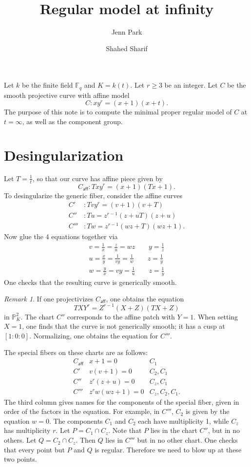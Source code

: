 \documentclass{article}
\newcommand{\caff}{C_{\textsf{aff}}}
\theoremstyle{plain}
\theoremstyle{definition}
\theoremstyle{remark}
\newtheorem{remark}[theorem]{Remark}
\newcommand{\F}{\ensuremath{\mathbb{F}}}
\newcommand{\Pro}{\ensuremath{\mathbb{P}}}
\begin{document}
\title{Regular model at infinity}
\author{Jenn Park \and Shahed Sharif}
\maketitle

Let $k$ be the finite field $\F_q$ and $K = k(t)$. Let $r \geq 3$ be an integer. Let $C$ be the smooth projective curve with affine model
\[
C: xy^r = (x+1)(x+t).
\]
The purpose of this note is to compute the minimal proper regular model of $C$ at $t = \infty$, as well as the component group.

\section{Desingularization}
\label{sec:desingularization}

Let $T = \frac{1}{t}$, so that our curve has affine piece given by
\[
\caff:Txy^r = (x+1)(Tx+1).
\]
To desingularize the generic fiber, consider the affine curves
\begin{align*}
  C'&: Tvy^r = (v+1)(v+T) \\
  C''&: Tu = z^{r-1}(z+uT)(z+u) \\
  C'''&: Tw = z^{r-1}(wz+T)(wz+1).
\end{align*}
Now glue the 4 equations together via
\begin{gather*}
  v = \frac{1}{x} = \frac{z}{u} = wz \qquad y = \frac{1}{z} \\
  u = \frac{x}{y} = \frac{1}{vy} = \frac{1}{w} \qquad z = \frac{1}{y}\\
  w = \frac{y}{x} = vy = \frac{1}{u} \qquad z = \frac{1}{y}
\end{gather*}
One checks that the resulting curve is generically smooth.
\begin{remark}
  If one projectivizes $\caff$, one obtains the equation
  \[
  TXY^r = Z^{r-1}(X+Z)(TX+Z)
  \]
  in $\Pro^2_K$. The chart $C''$ corresponds to the affine patch with $Y = 1$. When setting $X = 1$, one finds that the curve is not generically smooth; it has a cusp at $[1:0:0]$. Normalizing, one obtains the equation for $C'''$. 
\end{remark}


The special fibers on these charts are as follows:
\[
\begin{array}{lll}
\caff & x + 1 = 0 & C_1 \\
C' & v(v + 1) = 0 & C_2, C_1 \\
C'' & z^r(z + u) = 0 & C_z, C_1 \\
C''' & z^rw(wz+1) = 0 & C_z, C_2, C_1.
\end{array}
\]
The third column gives names for the components of the special fiber, given in order of the factors in the equation. For example, in $C'''$, $C_2$ is given by the equation $w = 0$. The components $C_1$ and $C_2$ each have multiplicity 1, while $C_z$ has multiplicity $r$. Let $P = C_1 \cap C_z$. Note that $P$ lies in the chart $C''$, but in no others. Let $Q = C_2 \cap C_z$. Then $Q$ lies in $C'''$ but in no other chart. One checks that every point but $P$ and $Q$ is regular. Therefore we need to blow up at these two points.
\end{document}
